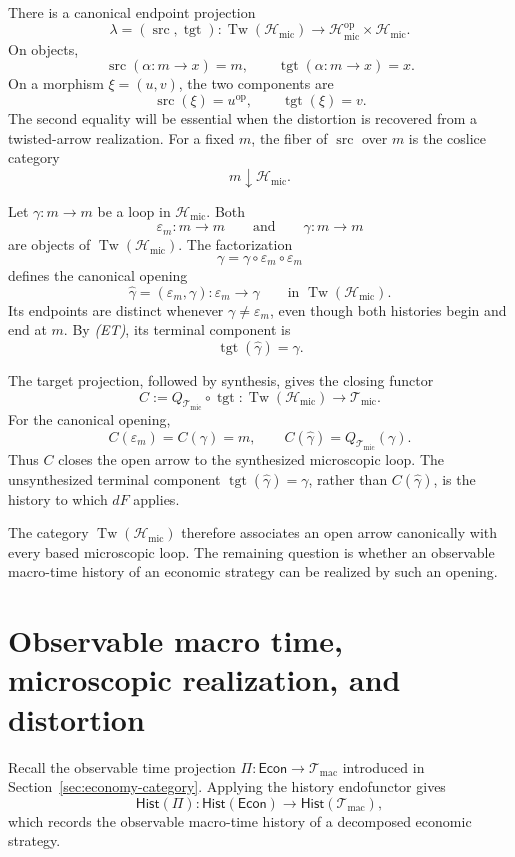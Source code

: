 \documentclass[11pt,a4paper]{article}
\newcommand{\Econ}{\mathsf{Econ}}
\newcommand{\Hist}{\mathsf{Hist}}
\newcommand{\Tw}{\operatorname{Tw}}
\newcommand{\Tmic}{\mathcal T_{\mathrm{mic}}}
\newcommand{\Tmac}{\mathcal T_{\mathrm{mac}}}
\newcommand{\Hmic}{\mathcal H_{\mathrm{mic}}}
\DeclareMathOperator{\src}{src}
\DeclareMathOperator{\tgt}{tgt}
\begin{document}
There is a canonical endpoint projection
\[
  \lambda=(\src,\tgt):
  \Tw(\Hmic)
  \longrightarrow
  \Hmic^{\mathrm{op}}\times\Hmic.
\]
On objects,
\[
  \src(\alpha:m\to x)=m,
  \qquad
  \tgt(\alpha:m\to x)=x.
\]
On a morphism \(\xi=(u,v)\), the two components are
\[
  \src(\xi)=u^{\mathrm{op}},
  \qquad
  \tgt(\xi)=v.
  \tag{ET}
\]
The second equality will be essential when the distortion is recovered from
a twisted-arrow realization. For a fixed \(m\), the fiber of \(\src\) over
\(m\) is the coslice category
\[
  m\downarrow\Hmic.
\]

Let \(\gamma:m\to m\) be a loop in \(\Hmic\). Both
\[
  \varepsilon_m:m\to m
  \qquad\text{and}\qquad
  \gamma:m\to m
\]
are objects of \(\Tw(\Hmic)\). The factorization
\[
  \gamma
  =
  \gamma\circ\varepsilon_m\circ\varepsilon_m
\]
defines the canonical opening
\[
  \widehat\gamma
  =
  (\varepsilon_m,\gamma):
  \varepsilon_m\longrightarrow\gamma
  \qquad\text{in }\Tw(\Hmic).
  \tag{U}
\]
Its endpoints are distinct whenever \(\gamma\neq\varepsilon_m\), even though
both histories begin and end at \(m\). By \emph{(ET)}, its terminal component
is
\[
	\tgt(\widehat\gamma)=\gamma.
  \tag{UT}
\]

The target projection, followed by synthesis, gives the closing functor
\[
  C
  :=
  Q_{\Tmic}\circ\tgt:
  \Tw(\Hmic)\longrightarrow\Tmic.
\]
For the canonical opening,
\[
  C(\varepsilon_m)=C(\gamma)=m,
  \qquad
  C(\widehat\gamma)=Q_{\Tmic}(\gamma).
\]
Thus \(C\) closes the open arrow to the synthesized microscopic loop. The
unsynthesized terminal component \(\tgt(\widehat\gamma)=\gamma\), rather than
\(C(\widehat\gamma)\), is the history to which \(dF\) applies.

The category \(\Tw(\Hmic)\) therefore associates an open arrow canonically
with every based microscopic loop. The remaining question is whether an
observable macro-time history of an economic strategy can be realized by
such an opening.

\section{Observable macro time, microscopic realization, and distortion}
\label{sec:macro-micro-realization}

Recall the observable time projection \(\Pi:\Econ\to\Tmac\) introduced in
Section~\ref{sec:economy-category}.
Applying the history endofunctor gives
\[
  \Hist(\Pi):
  \Hist(\Econ)\longrightarrow\Hist(\Tmac),
  \tag{HP}
\]
which records the observable macro-time history of a decomposed economic
strategy.
\end{document}
